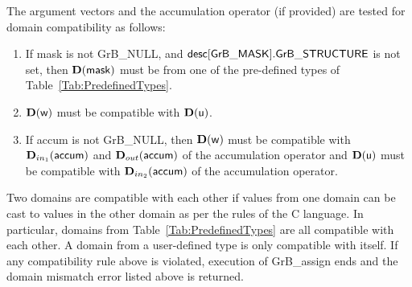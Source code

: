 The argument vectors and the accumulation 
operator (if provided) are tested for domain compatibility as follows:
\begin{enumerate}
	\item If {\sf mask} is not {\sf GrB\_NULL}, and ${\sf desc[GrB\_MASK].GrB\_STRUCTURE}$
    is not set, then $\bold{D}({\sf mask})$ must be from one of the pre-defined types of 
    Table~\ref{Tab:PredefinedTypes}.

	\item $\bold{D}({\sf w})$ must be
    compatible with $\bold{D}({\sf u})$.

	\item If {\sf accum} is not {\sf GrB\_NULL}, then $\bold{D}({\sf w})$ must be
    compatible with $\mbox{$\mathbf{D}_{in_{1}}$}({\sf accum})$ and $\mbox{$\mathbf{D}_{out}$}({\sf accum})$ of the accumulation operator and 
    $\bold{D}({\sf u})$ must be compatible with $\mbox{$\mathbf{D}_{in_{2}}$}({\sf accum})$ of the accumulation operator.
\end{enumerate}
Two domains are compatible with each other if values from one domain can be cast 
to values in the other domain as per the rules of the C language.
In particular, domains from Table~\ref{Tab:PredefinedTypes} are all compatible 
with each other. A domain from a user-defined type is only compatible with itself.
If any compatibility rule above is violated, execution of {\sf GrB\_assign} ends
and the domain mismatch error listed above is returned.

